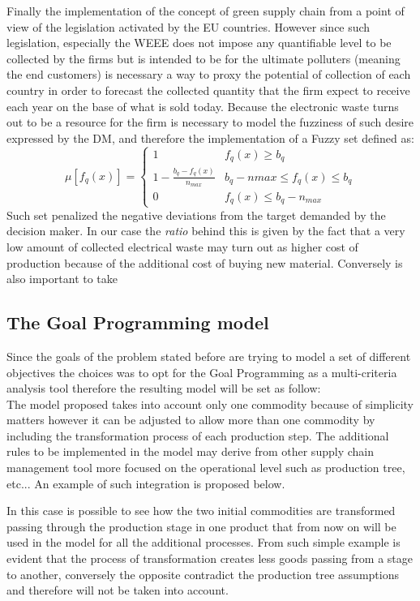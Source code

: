 \documentclass{article}
\begin{document}
Finally the  implementation of the concept of green supply chain from a point of view of the legislation activated by the EU countries. However since such legislation, especially the WEEE does not impose any quantifiable level to be collected by the firms but is intended to be for the ultimate polluters (meaning the end customers) is necessary a way to proxy the potential of collection of each country in order to forecast the collected quantity that the firm expect to receive each year on the base of what is sold today. Because the electronic waste turns out to be a resource for the firm is necessary to model the fuzziness of such desire expressed by the DM, and therefore the implementation of a Fuzzy set\cite{Zadeh_1965} defined as:
$$
\mu [f_q(x)]=
\begin{cases}
1 & f_q(x) \geq b_q \\
1-\frac{b_q-f_q(x)}{n_{max}} & b_q -n{max} \leq f_q(x) \leq b_q \\
0 & f_q(x) \leq b_q - n_{max}
\end{cases}
$$
Such set penalized the negative deviations from the target demanded by the decision maker. In our case the \textit{ratio} behind this is given by the fact that a very low amount of collected electrical waste may turn out as higher cost of production because of the additional cost of buying new material. Conversely is also important to take


\subsection{The Goal Programming model}
Since the goals of the problem stated before are trying to model a set of different objectives the choices was to opt for the Goal Programming as a multi-criteria analysis tool therefore the resulting model will be set as follow: 
\\
The model proposed takes into account only one commodity because of simplicity matters however it can be adjusted to allow more than one commodity by including the transformation process of each production step. The additional rules to be implemented in the model may derive from other supply chain management tool more focused on the operational level such as production tree, etc... An example of such integration is proposed below.

In this case is possible to see how the two initial commodities are transformed passing through the production stage in one product that from now on will be used in the model for all the additional processes. From such simple example is evident that the process of transformation creates less goods passing from a stage to another, conversely the opposite contradict the production tree assumptions and therefore will not be taken into account. 
\end{document}
